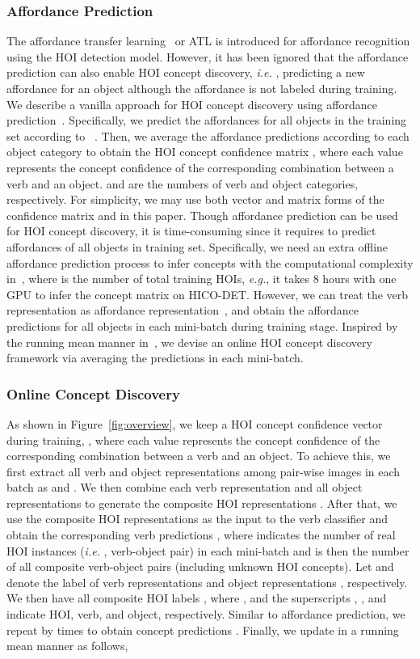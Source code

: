 \documentclass[runningheads]{llncs}
\newcommand{\ie}{\textit{i.e. }}
\newcommand{\eg}{\textit{e.g.}}
\begin{document}
\subsubsection{Affordance Prediction}
\label{sec:aff_pred}
The affordance transfer learning~\cite{hou2021atl} or ATL is introduced for affordance recognition using the HOI detection model. However, it has been ignored that the affordance prediction can also enable HOI concept discovery, \ie, predicting a new affordance for an object although the affordance is not labeled during training. We describe a vanilla approach for HOI concept discovery using affordance prediction~\cite{hou2021atl}. Specifically, we predict the affordances for all objects in the training set according to ~\cite{hou2021atl}. Then, we average the affordance predictions according to each object category to obtain the HOI concept confidence matrix , where each value represents the concept confidence of the corresponding combination between a verb and an object.  and  are the numbers of verb and object categories, respectively. For simplicity, we may use both vector and matrix forms of the confidence matrix  and  in this paper. Though affordance prediction can be used for HOI concept discovery, it is time-consuming since it requires to predict affordances of all objects in training set. Specifically, we need an extra offline affordance prediction process to infer concepts with the computational complexity  in~\cite{hou2021atl}, where  is the number of total training HOIs, \eg, it takes 8 hours with one GPU to infer the concept matrix  on HICO-DET. However, we can treat the verb representation as affordance representation~\cite{hou2021atl}, and obtain the affordance predictions for all objects in 
each mini-batch during training stage. Inspired by the running mean manner in~\cite{ioffe2015batch}, we devise an online HOI concept discovery framework via averaging the predictions in each mini-batch.


\subsubsection{Online Concept Discovery}
 As shown in Figure~\ref{fig:overview}, we keep a HOI concept confidence vector during training, , where each value represents the concept confidence of the corresponding combination between a verb and an object. To achieve this, we first extract all verb and object representations among pair-wise images in each batch as  and . We then combine each verb representation and all object representations to generate the composite HOI representations . After that, we use the composite HOI representations as the input to the verb classifier and obtain the corresponding verb predictions , where  indicates the number of real HOI instances (\ie, verb-object pair) in each mini-batch and  is then the number of all composite verb-object pairs (including unknown HOI concepts). Let  and  denote the label of verb representations  and object representations , respectively. We then have all composite HOI labels , where , and the superscripts , , and  indicate HOI, verb, and object, respectively. Similar to affordance prediction, we repeat  by  times to obtain concept predictions . Finally, we update  in a running mean manner \cite{ioffe2015batch} as follows,
\end{document}
